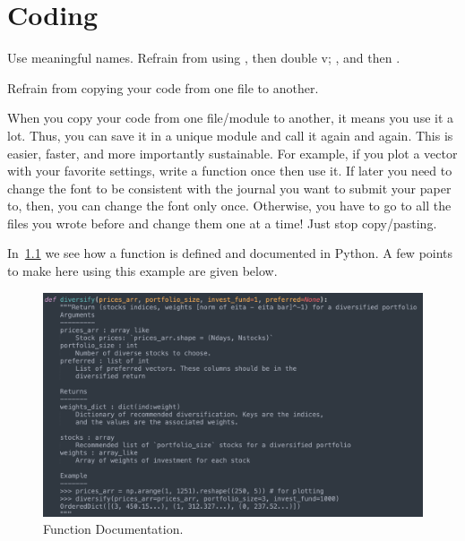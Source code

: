 \chapter{Coding}
\label{chap:Coding}


\begin{rem}
Use meaningful names. Refrain from 
using , then double v; ,
and then .
\end{rem}


\begin{rem}
Refrain from copying your code from
one file to another.
\end{rem}
\noindent When you copy your code from one file/module
to another, it means you use it a lot. Thus, you can
save it in a unique module and call it again and again.
This is easier, faster, and more importantly sustainable.
For example, if you plot a vector with your favorite settings,
write a function once then use it. If later you need
to change the font to be consistent with
the journal you want to submit your paper to, then, you can
change the font only once. Otherwise, you have to go to
all the files you wrote before and change them one at a time!
Just stop copy/pasting.

In~\cref{fig:FunctionDocumentation} we see how a function is defined
and documented in Python.
A few points to make here using this example are given below.
\begin{figure}
  \centering
  \includegraphics[width=1\textwidth]{figures/function_documentation}
  \caption{Function Documentation.}
  \label{fig:FunctionDocumentation}
\end{figure}

